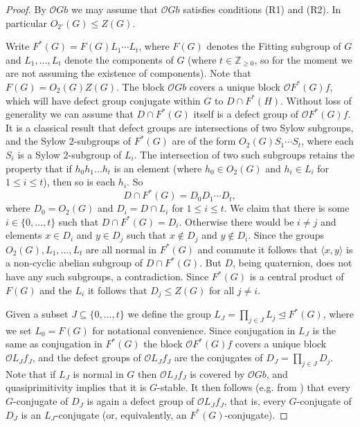 \documentclass{amsart}
\theoremstyle{plain}\newtheorem{Theorem}{Theorem}[section]
\theoremstyle{plain}\newtheorem{Conjecture}[Theorem]{Conjecture}
\theoremstyle{plain}\newtheorem{Corollary}[Theorem]{Corollary}
\theoremstyle{plain}\newtheorem{Lemma}[Theorem]{Lemma}
\theoremstyle{plain}\newtheorem{Proposition}[Theorem]{Proposition}
\theoremstyle{definition}\newtheorem{Definition}[Theorem]{Definition}
\theoremstyle{definition}\newtheorem{Example}[Theorem]{Example}
\theoremstyle{definition}\newtheorem{Examples}[Theorem]{Examples}
\theoremstyle{definition}\newtheorem{Exercise}[Theorem]{Exercise}
\theoremstyle{definition}\newtheorem{Notation}[Theorem]{Notation}
\theoremstyle{definition}\newtheorem{Remark}[Theorem]{Remark}
\theoremstyle{definition}\newtheorem{Remarks}[Theorem]{Remarks}
\def\CO{{\mathcal{O}}}    \def\OPE{{\mathcal{O}(P\rtimes E)}}
\numberwithin{equation}{section}
\begin{document}
\begin{proof}
By  $\CO Gb$ we may assume that $\CO Gb$ satisfies conditions (R1) and (R2). In particular $O_{2'}(G)\leq Z(G)$. 

Write $F^*(G) = F(G)L_1\cdots L_t$, where $F(G)$ denotes the Fitting subgroup of $G$ and $L_1,\ldots, L_t$ denote the components of $G$ (where $t\in \mathbb Z_{\geq 0}$, so for the moment we are not assuming the existence of components). Note that  $F(G)=O_2(G)Z(G)$. The block $\CO G b$ covers a unique block $\CO F^*(G)f$, which will have defect group conjugate within $G$ to $D\cap F^*(H)$. Without loss of generality we can assume that $D\cap F^*(G)$ itself is a defect group of $\CO F^*(G)f$. It is a classical result that defect groups are intersections of two Sylow subgroups, and the Sylow $2$-subgroups of $F^*(G)$ are of the form $O_2(G)S_1\cdots S_t$, where each $S_i$ is a Sylow $2$-subgroup of $L_i$. The intersection of two such subgroups retains the property that if $h_0h_1\ldots h_t$ is an element (where $h_0\in O_2(G)$ and $h_i\in L_i$ for $1\leq i \leq t$), then so is each $h_i$.  So 
  $$D\cap F^*(G)= D_0D_1\cdots D_t,$$
where $D_0=O_2(G)$ and $D_i=D\cap L_i$ for $1\leq i \leq t$. We claim that there is some $i\in\{0,\ldots, t\}$ such that $D\cap F^*(G)=D_i$. Otherwise there would be $i\neq j$ and elements $x\in D_i$ and $y\in D_j$ such that $x\not\in D_j$ and $y\not\in D_i$. Since the groups $O_2(G), L_1,\ldots, L_t$ are all normal in $F^*(G)$ and commute it follows that $\langle x,y \rangle$ is a non-cyclic abelian subgroup of $D\cap F^*(G)$. But $D$, being quaternion, does not have any such subgroups, a contradiction. Since $F^*(G)$ is a central product of $F(G)$ and the $L_i$ it follows that $D_j\leq Z(G)$ for all $j\neq i$.

Given a subset $J\subseteq \{0,\ldots,t\}$ we define the group $L_J=\prod_{j\in J}L_j\unlhd F^*(G)$, where we set $L_0=F(G)$ for notational convenience. Since conjugation in $L_J$ is the same as conjugation in $F^*(G)$ the block $\CO F^*(G)f$ covers a unique block $\CO L_Jf_J$, and the defect groups of $\CO L_J f_J$ are the conjugates of $D_J =\prod_{j\in J}D_j$. Note that if $L_J$ is normal in $G$ then $\CO L_J f_J$ is covered by $\CO G b$, and quasiprimitivity implies that it is $G$-stable. It then follows (e.g. from \cite[Thm.~6.8.9~(ii)]{LiBookII}) that every $G$-conjugate of $D_J$ is again a defect group of $\CO L_J f_J$, that is, every $G$-conjugate of $D_J$ is an $L_J$-conjugate (or, equivalently, an $F^*(G)$-conjugate).


\end{proof}
\end{document}

